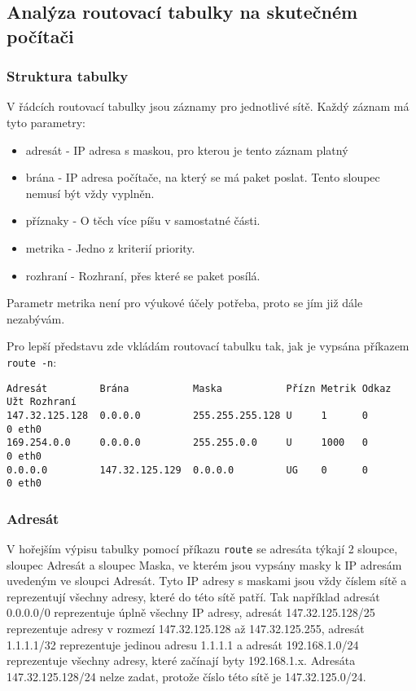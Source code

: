 \subsection{Analýza routovací tabulky na skutečném počítači}

\subsubsection{Struktura tabulky}

V řádcích routovací tabulky jsou záznamy pro jednotlivé sítě. Každý záznam má tyto parametry:
\begin{itemize}
\item adresát - IP adresa s maskou, pro kterou je tento záznam platný
\item brána - IP adresa počítače, na který se má paket poslat. Tento sloupec nemusí být vždy vyplněn.
\item příznaky - O těch více píšu v samostatné části.
\item metrika - Jedno z kriterií priority.
\item rozhraní - Rozhraní, přes které se paket posílá.
\end{itemize}
Parametr metrika není pro výukové účely potřeba, proto se jím již dále nezabývám.

Pro lepší představu zde vkládám routovací tabulku tak, jak je vypsána příkazem \verb|route -n|:
\begin{verbatim}
Adresát         Brána           Maska           Přízn Metrik Odkaz  Užt Rozhraní
147.32.125.128  0.0.0.0         255.255.255.128 U     1      0        0 eth0
169.254.0.0     0.0.0.0         255.255.0.0     U     1000   0        0 eth0
0.0.0.0         147.32.125.129  0.0.0.0         UG    0      0        0 eth0
\end{verbatim}

\subsubsection{Adresát}

V hořejším výpisu tabulky pomocí příkazu \verb|route| se adresáta týkají 2 sloupce, sloupec Adresát a sloupec Maska, ve kterém jsou vypsány masky k IP adresám uvedeným ve sloupci Adresát. Tyto IP adresy s maskami jsou vždy číslem sítě a reprezentují všechny adresy, které do této sítě patří. Tak například adresát 0.0.0.0/0 reprezentuje úplně všechny IP adresy, adresát 147.32.125.128/25 reprezentuje adresy v rozmezí 147.32.125.128 až 147.32.125.255, adresát 1.1.1.1/32 reprezentuje jedinou adresu 1.1.1.1 a adresát 192.168.1.0/24 reprezentuje všechny adresy, které začínají byty 192.168.1.x. Adresáta 147.32.125.128/24 nelze zadat, protože číslo této sítě je 147.32.125.0/24.

